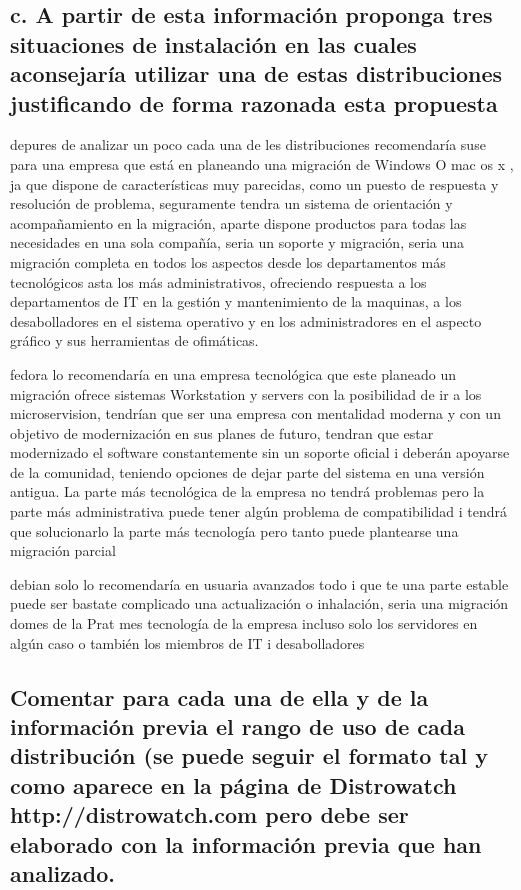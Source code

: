 \documentclass[preprint,11pt]{elsarticle}
\begin{document}
\subsection{c. A partir de esta información proponga tres situaciones de instalación en las cuales aconsejaría utilizar una de estas distribuciones justificando de forma razonada esta propuesta}\bigskip

depures de analizar un poco cada una de les distribuciones recomendaría suse para una empresa que está en planeando una migración de Windows O mac os x , ja que dispone de características muy parecidas, como un puesto de respuesta y resolución de problema, seguramente tendra un sistema de orientación y acompañamiento en la migración, aparte dispone productos para todas las necesidades en una sola compañía, seria un soporte y migración, seria una migración completa en todos los aspectos desde los departamentos más tecnológicos asta los más administrativos, ofreciendo respuesta a los departamentos de IT en la gestión y mantenimiento de la maquinas, a los desabolladores en el sistema operativo y en los administradores en el aspecto gráfico y sus herramientas de ofimáticas.\bigskip

fedora lo recomendaría en una empresa tecnológica que este planeado un migración ofrece sistemas Workstation y servers con la posibilidad de ir a los microservision, tendrían que ser una empresa con mentalidad moderna y con un objetivo de modernización en sus planes de futuro, tendran que estar modernizado el software constantemente sin un soporte oficial i deberán apoyarse de la comunidad, teniendo opciones de dejar parte del sistema en una versión antigua. La parte más tecnológica de la empresa no tendrá problemas pero la parte más administrativa puede tener algún problema de compatibilidad i tendrá que solucionarlo la parte más tecnología pero tanto puede plantearse una migración parcial\bigskip


debian solo lo recomendaría en usuaria avanzados todo i que te una parte estable puede ser bastate complicado una actualización o inhalación, seria una migración domes de la Prat mes tecnología de la empresa incluso solo los servidores en algún caso o también los miembros de IT i desabolladores\bigskip

\subsection{ Comentar para cada una de ella y de la información previa el rango de uso de cada distribución (se puede seguir el formato tal y como aparece en la página de Distrowatch http://distrowatch.com pero debe ser elaborado con la información previa que han analizado.}\bigskip
\end{document}
